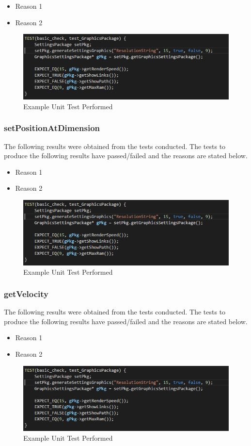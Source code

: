 \documentclass[11pt]{article}
\begin{document}
\begin{itemize}
	\item Reason 1
	\item Reason 2
\end{itemize}
\begin{figure}
\includegraphics[scale=0.5]{GTest.png}
\caption{Example Unit Test Performed}
\end{figure}
\subsubsection{setPositionAtDimension}
The following results were obtained from the tests conducted. The tests to produce the
following results have passed/failed and the reasons are stated below.

\begin{itemize}
	\item Reason 1
	\item Reason 2
\end{itemize}
\begin{figure}
\includegraphics[scale=0.5]{GTest.png}
\caption{Example Unit Test Performed}
\end{figure}
\subsubsection{getVelocity}
The following results were obtained from the tests conducted. The tests to produce the
following results have passed/failed and the reasons are stated below.

\begin{itemize}
	\item Reason 1
	\item Reason 2
\end{itemize}
\begin{figure}
\includegraphics[scale=0.5]{GTest.png}
\caption{Example Unit Test Performed}
\end{figure}
\end{document}
